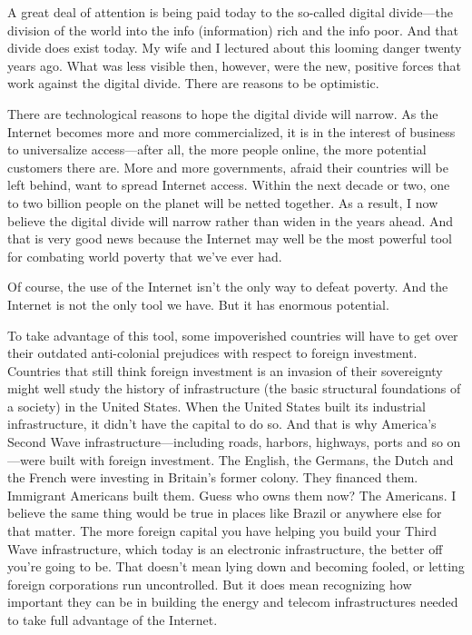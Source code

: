 A great deal of attention is being paid today to the so-called digital
divide---the division of the world into the info (information) rich and
the info poor. And that divide does exist today. My wife and I lectured
about this looming danger twenty years ago. What was less visible then,
however, were the new, positive forces that work against the digital
divide. There are reasons to be optimistic.

There are technological reasons to hope the digital divide will narrow.
As the Internet becomes more and more commercialized, it is in the
interest of business to universalize access---after all, the more people
online, the more potential customers there are. More and more
governments, afraid their countries will be left behind, want to spread
Internet access. Within the next decade or two, one to two billion
people on the planet will be netted together. As a result, I now believe
the digital divide will narrow rather than widen in the years ahead. And
that is very good news because the Internet may well be the most
powerful tool for combating world poverty that we've ever had.

Of course, the use of the Internet isn't the only way to defeat poverty.
And the Internet is not the only tool we have. But it has enormous
potential.

To take advantage of this tool, some impoverished countries will have to
get over their outdated anti-colonial prejudices with respect to foreign
investment. Countries that still think foreign investment is an invasion
of their sovereignty might well study the history of infrastructure (the
basic structural foundations of a society) in the United States. When
the United States built its industrial infrastructure, it didn't have
the capital to do so. And that is why America's Second Wave
infrastructure---including roads, harbors, highways, ports and so on---were
built with foreign investment. The English, the Germans, the Dutch and
the French were investing in Britain's former colony. They financed
them. Immigrant Americans built them. Guess who owns them now? The
Americans. I believe the same thing would be true in places like Brazil
or anywhere else for that matter. The more foreign capital you have
helping you build your Third Wave infrastructure, which today is an
electronic infrastructure, the better off you're going to be. That
doesn't mean lying down and becoming fooled, or letting foreign
corporations run uncontrolled. But it does mean recognizing how
important they can be in building the energy and telecom infrastructures
needed to take full advantage of the Internet.



